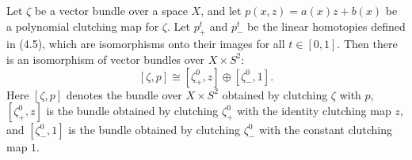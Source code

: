 Let $\zeta$ be a vector bundle over a space $X$, and let $p(x,z) = a(x)z + b(x)$ be a polynomial clutching map for $\zeta$. Let $p_+^t$ and $p_-^t$ be the linear homotopies defined in (4.5), which are isomorphisms onto their images for all $t \in [0,1]$. Then there is an isomorphism of vector bundles over $X \times S^2$:
$$
[\zeta, p] \cong [\zeta_+^0, z] \oplus [\zeta_-^0, 1].
$$
Here $[\zeta, p]$ denotes the bundle over $X \times S^2$ obtained by clutching $\zeta$ with $p$, $[\zeta_+^0, z]$ is the bundle obtained by clutching $\zeta_+^0$ with the identity clutching map $z$, and $[\zeta_-^0, 1]$ is the bundle obtained by clutching $\zeta_-^0$ with the constant clutching map $1$.
